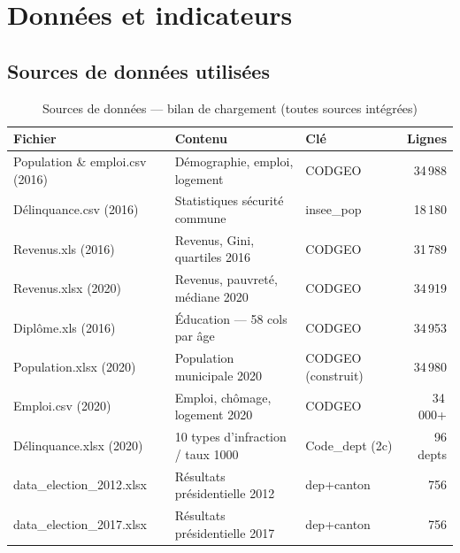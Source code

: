 \documentclass[12pt,a4paper,oneside]{report}
\begin{document}
\chapter{Données et indicateurs}

\section{Sources de données utilisées}

\begin{table}[H]
  \centering
  \caption{Sources de données — bilan de chargement (toutes sources intégrées)}
  \label{tab:sources}
  \setlength{\tabcolsep}{5pt}
  \small
  \begin{tabularx}{\textwidth}{>{\ttfamily\small}p{4.4cm}Xp{2.9cm}r}
    \toprule
    \normalfont\textbf{Fichier} & \textbf{Contenu} & \textbf{Clé} & \textbf{Lignes} \\
    \midrule
    Population \& emploi.csv (2016) & Démographie, emploi, logement       & CODGEO              & 34\,988 \\
    Délinquance.csv (2016)          & Statistiques sécurité commune       & insee\_pop          & 18\,180 \\
    Revenus.xls (2016)              & Revenus, Gini, quartiles 2016       & CODGEO              & 31\,789 \\
    Revenus.xlsx (2020)             & Revenus, pauvreté, médiane 2020     & CODGEO              & 34\,919 \\
    Diplôme.xls (2016)              & Éducation — 58 cols par âge         & CODGEO              & 34\,953 \\
    Population.xlsx (2020)          & Population municipale 2020          & CODGEO (construit)  & 34\,980 \\
    Emploi.csv (2020)               & Emploi, chômage, logement 2020      & CODGEO              & 34\,000+ \\
    Délinquance.xlsx (2020)         & 10 types d'infraction / taux 1000   & Code\_dept (2c)     & 96 depts \\
    data\_election\_2012.xlsx       & Résultats présidentielle 2012       & dep+canton          & 756 \\
    data\_election\_2017.xlsx       & Résultats présidentielle 2017       & dep+canton          & 756 \\
    \bottomrule
  \end{tabularx}
  \normalsize
\end{table}
\end{document}
